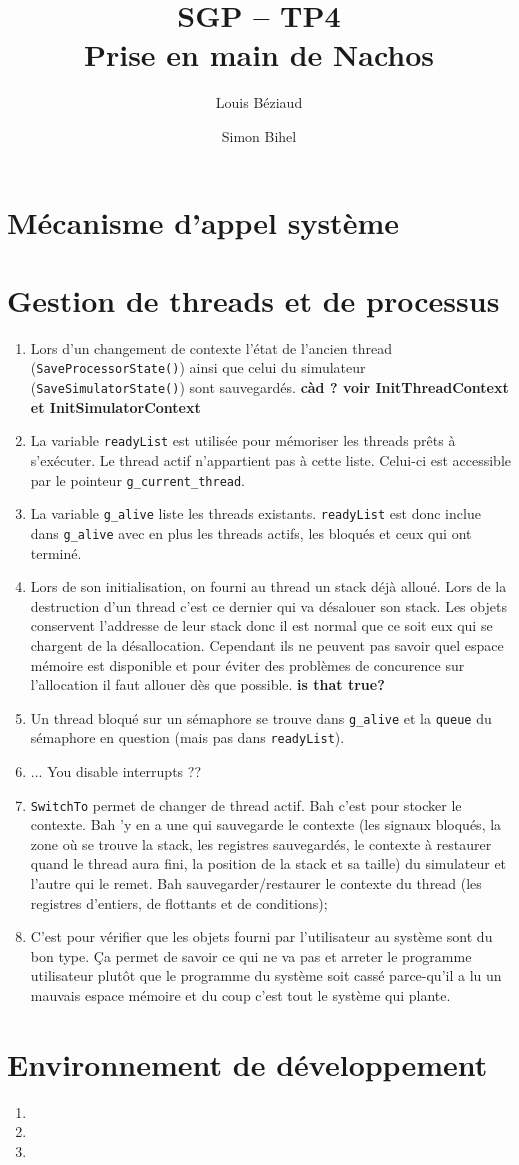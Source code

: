 \documentclass{article}
\title{SGP -- TP4\\Prise en main de Nachos}
\author{Louis Béziaud \and Simon Bihel}
\begin{document}
\maketitle

\section{Mécanisme d'appel système}

\section{Gestion de threads et de processus}

\begin{enumerate}
\item Lors d'un changement de contexte l'état de l'ancien thread ({\tt SaveProcessorState()}) ainsi que celui du simulateur ({\tt SaveSimulatorState()}) sont sauvegardés. {\bf càd ? voir InitThreadContext et InitSimulatorContext}
\item La variable {\tt readyList} est utilisée pour mémoriser les threads prêts à s'exécuter. Le thread actif n'appartient pas à cette liste. Celui-ci est accessible par le pointeur {\tt g\_current\_thread}.
\item La variable {\tt g\_alive} liste les threads existants. {\tt readyList} est donc inclue dans {\tt g\_alive} avec en plus les threads actifs, les bloqués et ceux qui ont terminé.
\item Lors de son initialisation, on fourni au thread un stack déjà alloué. Lors de la destruction d'un thread c'est ce dernier qui va désalouer son stack. Les objets conservent l'addresse de leur stack donc il est normal que ce soit eux qui se chargent de la désallocation. Cependant ils ne peuvent pas savoir quel espace mémoire est disponible et pour éviter des problèmes de concurence sur l'allocation il faut allouer dès que possible. {\bf is that true?}
\item Un thread bloqué sur un sémaphore se trouve dans {\tt g\_alive} et la {\tt queue} du sémaphore en question (mais pas dans {\tt readyList}).
\item ... You disable interrupts ??
\item {\tt SwitchTo} permet de changer de thread actif. Bah c'est pour stocker le contexte. Bah 'y en a une qui sauvegarde le contexte (les signaux bloqués, la zone où se trouve la stack, les registres sauvegardés, le contexte à restaurer quand le thread aura fini, la position de la stack et sa taille) du simulateur et l'autre qui le remet. Bah sauvegarder/restaurer le contexte du thread (les registres d'entiers, de flottants et de conditions);
\item C'est pour vérifier que les objets fourni par l'utilisateur au système sont du bon type. Ça permet de savoir ce qui ne va pas et arreter le programme utilisateur plutôt que le programme du système soit cassé parce-qu'il a lu un mauvais espace mémoire et du coup c'est tout le système qui plante.
\end{enumerate}

\section{Environnement de développement}

\begin{enumerate}
\item
\item
\item
\end{enumerate}
\end{document}
